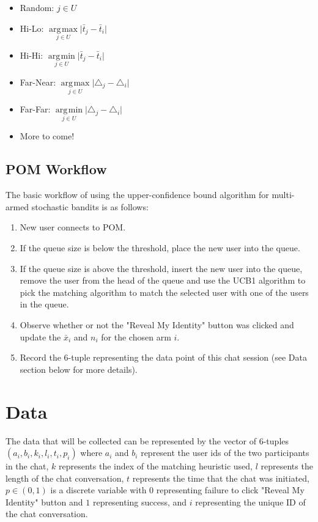 \documentclass{article}
\DeclareMathOperator*{\argmin}{\arg\!\min}
\DeclareMathOperator*{\argmax}{\arg\!\max}
\begin{document}
\begin{itemize}
  \item Random: $ j \in{U} $
  \item Hi-Lo: $\underset{j \in{U}}{\argmax} \lvert{\bar{t}_j - \bar{t}_i}\rvert\ $
  \item Hi-Hi: $\underset{j \in{U}}{\argmin} \lvert{\bar{t}_j - \bar{t}_i}\rvert\ $
  \item Far-Near: $\underset{j \in{U}}{\argmax} \lvert{\triangle_j - \triangle_i}\rvert\ $
  \item Far-Far: $\underset{j \in{U}}{\argmin} \lvert{\triangle_j - \triangle_i}\rvert\ $
  \item More to come!
\end{itemize}

\subsection{POM Workflow}

The basic workflow of using the upper-confidence bound algorithm for multi-armed stochastic bandits is as follows: 

\begin{enumerate}
\item New user connects to POM.
\item If the queue size is below the threshold, place the new user into the queue.
\item If the queue size is above the threshold, insert the new user into the queue, remove the user from the head of the queue and use the UCB1 algorithm to pick the matching algorithm to match the selected user with one of the users in the queue. 
\item Observe whether or not the "Reveal My Identity" button was clicked and update the $\bar{x}_i$ and $n_i$ for the chosen arm $i$.
\item Record the 6-tuple representing the data point of this chat session (see Data section below for more details).
\end{enumerate}

\section{Data}

The data that will be collected can be represented by the vector of 6-tuples $(a_i, b_i, k_i, l_i, t_i, p_i)$ where $a_i$ and $b_i$ represent the user ids of the two participants in the chat, $k$ represents the index of the matching heuristic used, $l$ represents the length of the chat conversation, $t$ represents the time that the chat was initiated, $p \in{(0, 1)} $ is a discrete variable with $0$ representing failure to click "Reveal My Identity" button and $1$ representing success, and $i$ representing the unique ID of the chat conversation.
\end{document}
